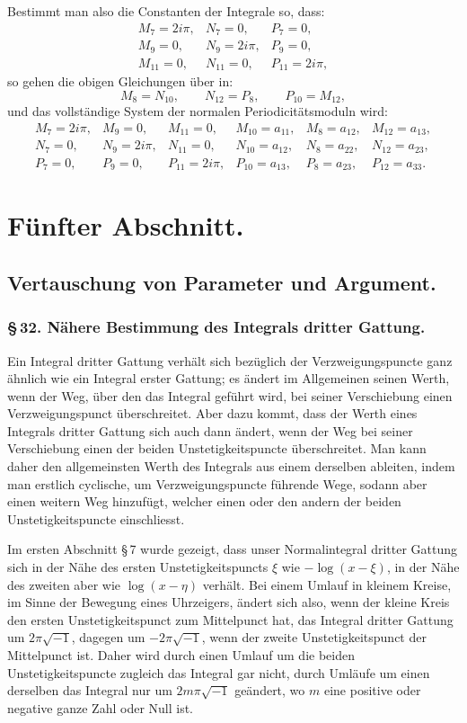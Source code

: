 \documentclass[10pt]{article}
\begin{document}
Bestimmt man also die Constanten der Integrale so, dass:
\[
\begin{array}{lll}
M_7=2i\pi,&N_7=0,&P_7=0,\\
M_9=0,&N_9=2i\pi,&P_9=0,\\
M_{11}=0,&N_{11}=0,&P_{11}=2i\pi,
\end{array}
\]
so gehen die obigen Gleichungen über in:
\[
M_8=N_{10},\qquad N_{12}=P_8,\qquad P_{10}=M_{12},
\]
und das vollständige System der normalen Periodicitätsmoduln wird:
\[
\begin{array}{llllll}
M_7=2i\pi,&M_9=0,&M_{11}=0,&M_{10}=a_{11},&M_8=a_{12},&M_{12}=a_{13},\\
N_7=0,&N_9=2i\pi,&N_{11}=0,&N_{10}=a_{12},&N_8=a_{22},&N_{12}=a_{23},\\
P_7=0,&P_9=0,&P_{11}=2i\pi,&P_{10}=a_{13},&P_8=a_{23},&P_{12}=a_{33}.
\end{array}
\]


\section*{Fünfter Abschnitt.}
\subsection*{Vertauschung von Parameter und Argument.}

\subsubsection*{\S\,32. Nähere Bestimmung des Integrals dritter Gattung.}

Ein Integral dritter Gattung verhält sich bezüglich der Verzweigungspuncte ganz ähnlich wie ein Integral erster Gattung; es ändert im Allgemeinen seinen Werth, wenn der Weg, über den das Integral geführt wird, bei seiner Verschiebung einen Verzweigungspunct überschreitet. Aber dazu kommt, dass der Werth eines Integrals dritter Gattung sich auch dann ändert, wenn der Weg bei seiner Verschiebung einen der beiden Unstetigkeitspuncte überschreitet. Man kann daher den allgemeinsten Werth des Integrals aus einem derselben ableiten, indem man erstlich cyclische, um Verzweigungspuncte führende Wege, sodann aber einen weitern Weg hinzufügt, welcher einen oder den andern der beiden Unstetigkeitspuncte einschliesst.

Im ersten Abschnitt \S\,7 wurde gezeigt, dass unser Normalintegral dritter Gattung sich in der Nähe des ersten Unstetigkeitspuncts \(\xi\) wie \(-\log(x-\xi)\), in der Nähe des zweiten aber wie \(\log(x-\eta)\) verhält. Bei einem Umlauf in kleinem Kreise, im Sinne der Bewegung eines Uhrzeigers, ändert sich also, wenn der kleine Kreis den ersten Unstetigkeitspunct zum Mittelpunct hat, das Integral dritter Gattung um \(2\pi\sqrt{-1}\), dagegen um \(-2\pi\sqrt{-1}\), wenn der zweite Unstetigkeitspunct der Mittelpunct ist. Daher wird durch einen Umlauf um die beiden Unstetigkeitspuncte zugleich das Integral gar nicht, durch Umläufe um einen derselben das Integral nur um \(2m\pi\sqrt{-1}\) geändert, wo \(m\) eine positive oder negative ganze Zahl oder Null ist.
\end{document}
